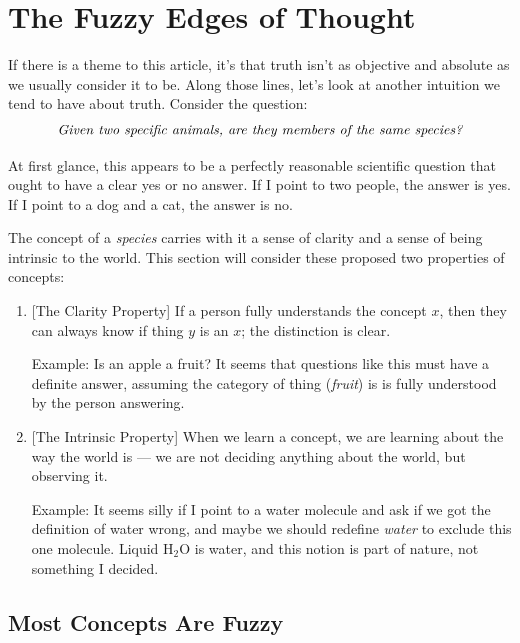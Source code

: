 \documentclass[11pt, oneside]{article}
\theoremstyle{argtstyle}
\begin{document}
\section{The Fuzzy Edges of Thought}

If there is a theme to this article, it's that truth isn't as
objective and absolute as we usually consider it to be.
Along those lines, let's
look at another intuition we tend to have about truth.
Consider the question:
\begin{equation*}\label{eq4}
    \text{\em Given two specific animals, are they members of the same
    species?}
\end{equation*}

At first glance, this appears to be a perfectly reasonable scientific question
that ought to have a clear yes or no answer. If I point to two people, the
answer is yes. If I point to a dog and a cat, the answer is no.

The concept of a {\em species} carries with it a sense of clarity and a
sense of being intrinsic to the world.
This section will consider
these proposed two properties of concepts:
\begin{enumerate}
    \item{} [The Clarity Property]
        If a person fully understands the concept $x$,
        then they can always know if thing $y$ is an $x$;
        the distinction is clear.

        Example: Is an apple a fruit? It seems that questions like this must
        have a definite answer, assuming the category of thing ({\em fruit}) is
        is fully understood by the person answering.
    \item{} [The Intrinsic Property]
        When we learn a concept, we are learning about the way the world
        is --- we are not deciding anything about the world, but observing it.

        Example: It seems silly if I point to a water molecule and ask if we got
        the definition of water wrong, and maybe we should redefine {\em water}
        to exclude this one molecule.
        Liquid H$_2$O is water, and this notion is part
        of nature, not something I decided.
\end{enumerate}


\subsection{Most Concepts Are Fuzzy}
\end{document}
